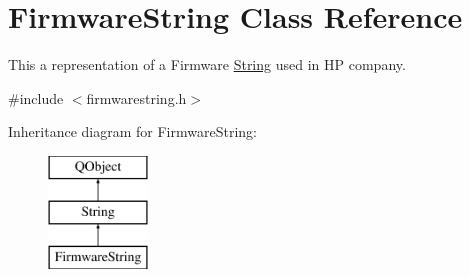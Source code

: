 \hypertarget{classFirmwareString}{}\section{Firmware\+String Class Reference}
\label{classFirmwareString}


This a representation of a Firmware \mbox{\hyperlink{classString}{String}} used in HP company.  




{\ttfamily \#include $<$firmwarestring.\+h$>$}

Inheritance diagram for Firmware\+String\+:\begin{figure}[H]
\begin{center}
\leavevmode
\includegraphics[height=3.000000cm]{classFirmwareString}
\end{center}
\end{figure}
